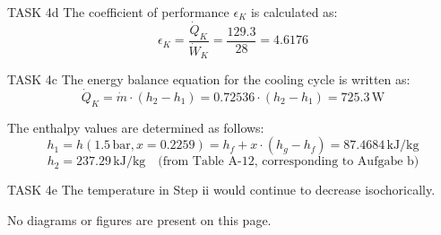 TASK 4d  
The coefficient of performance \( \epsilon_K \) is calculated as:  
\[
\epsilon_K = \frac{\dot{Q}_K}{\dot{W}_K} = \frac{129.3}{28} = 4.6176
\]

TASK 4c  
The energy balance equation for the cooling cycle is written as:  
\[
\dot{Q}_K = \dot{m} \cdot (h_2 - h_1) = 0.72536 \cdot (h_2 - h_1) = 725.3 \, \text{W}
\]  

The enthalpy values are determined as follows:  
\[
h_1 = h(1.5 \, \text{bar}, x = 0.2259) = h_f + x \cdot (h_g - h_f) = 87.4684 \, \text{kJ/kg}
\]  
\[
h_2 = 237.29 \, \text{kJ/kg} \quad \text{(from Table A-12, corresponding to Aufgabe b)}
\]

TASK 4e  
The temperature in Step ii would continue to decrease isochorically.  

No diagrams or figures are present on this page.